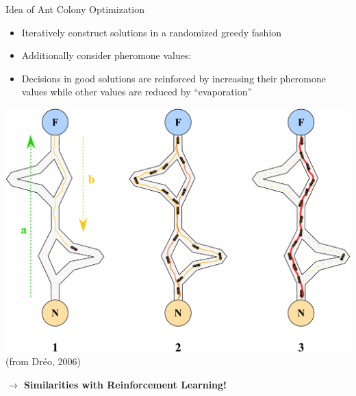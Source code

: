 \documentclass[aspectratio=1610]{beamer}
\newcommand{\important}[1]{{\color{green!60!black}#1}}
\renewcommand{\footnotesize}{\scriptsize}
\begin{document}
\begin{frame}{Idea of Ant Colony Optimization}
	\begin{itemize}
		\item Iteratively construct solutions in a randomized greedy fashion
		\item Additionally consider \important{pheromone values}:
		\item Decisions in good solutions are \important{reinforced} by increasing their pheromone values while other values are reduced by ``evaporation''
	\end{itemize}
	\begin{center}
		\includegraphics[width=0.4\linewidth]{figures/aco} \\
		{\footnotesize (from Dr\'eo, 2006)}

    \bigskip
    \important{\bf $\rightarrow$ Similarities with Reinforcement Learning!}
	\end{center}
\end{frame}


\end{document}
